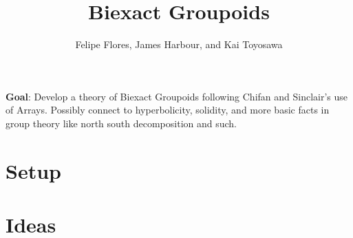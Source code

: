 \documentclass[12pt]{article}
\title{Biexact Groupoids}
\author{Felipe Flores, James Harbour, and Kai Toyosawa}
\begin{document}
\maketitle

\textbf{Goal}: Develop a theory of Biexact Groupoids following Chifan and Sinclair's use of Arrays. Possibly connect to hyperbolicity, solidity, and more basic facts in group theory like north south decomposition and such.

\section{Setup}

\section{Ideas}

\printbibliography
\end{document}
